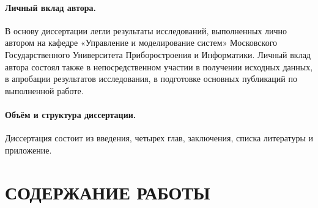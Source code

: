 \paragraph{Личный вклад автора.}
В основу диссертации легли результаты исследований, выполненных лично автором на кафедре «Управление и моделирование систем» Московского Государственного
Университета Приборостроения и Информатики. Личный вклад автора состоял также в непосредственном участии в получении исходных данных, в апробации результатов исследования,
в подготовке основных публикаций по выполненной работе.

\paragraph{Объём и структура диссертации.}
Диссертация состоит из введения, четырех глав, заключения, списка литературы и приложение.

\section*{СОДЕРЖАНИЕ РАБОТЫ}








\newpage
